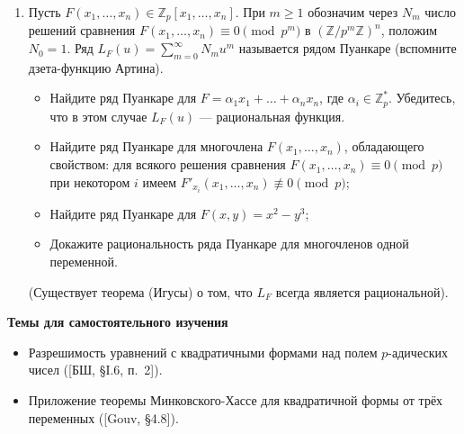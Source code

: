 \documentclass[a4paper, 11pt]{article}
\begin{document}
\begin{enumerate}[topsep=0pt]
    \item Пусть $F(x_1,\dots,x_n) \in \mathbb{Z}_p[x_1,\dots,x_n]$. При $m\ge1$ обозначим через $N_m$ число решений сравнения $F(x_1,\dots,x_n)\equiv0\pmod{p^m}$ в $(\mathbb{Z}/p^m\mathbb{Z})^n$, положим $N_0=1$. Ряд $L_F(u)=\sum_{m=0}^\infty N_m u^m$ называется рядом Пуанкаре (вспомните дзета-функцию Артина).
    \begin{itemize}[topsep=0pt]
        \item Найдите ряд Пуанкаре для $F = \alpha_1 x_1 + \dots + \alpha_n x_n$, где $\alpha_i \in \mathbb{Z}_p^*$. Убедитесь, что в этом случае $L_F(u)$ --- рациональная функция.
        \item Найдите ряд Пуанкаре для многочлена $F(x_1,\dots, x_n)$, обладающего свойством: для всякого решения сравнения $F(x_1,\dots, x_n) \equiv 0 \pmod{p}$ при некотором $i$ имеем $F'_{x_i}(x_1,\dots, x_n) \not\equiv 0 \pmod{p}$;
        \item Найдите ряд Пуанкаре для $F(x,y)=x^2-y^3$;
        \item Докажите рациональность ряда Пуанкаре для многочленов одной переменной.
    \end{itemize}
    (Существует теорема (Игусы) о том, что $L_F$ всегда является рациональной).

\end{enumerate}


\noindent\textbf{Темы для самостоятельного изучения}
\begin{itemize}[topsep=0pt]
    \item Разрешимость уравнений с квадратичными формами над полем $p$-адических чисел ([БШ, \S I.6, п.~2]).
    \item Приложение теоремы Минковского-Хассе для квадратичной формы от трёх переменных ([Gouv, \S 4.8]).
\end{itemize}
\end{document}
